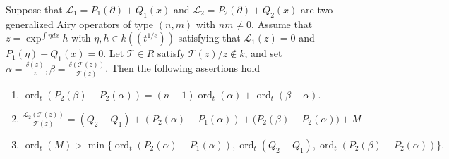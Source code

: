 \documentclass[10pt,a4paper]{amsart}
\DeclareMathOperator{\ord}{ord}
\newcommand{\calL}{{\mathcal{L}}}
\newcommand{\calT}{{\mathcal{T}}}
\begin{document}
\begin{lemma}
  \label{LM:minimalorderinL2}
  Suppose that $\calL_1=P_1(\partial)+Q_1(x)$ and $\calL_2=P_2(\partial)+Q_2(x)$
  are two generalized Airy operators of type $(n,m)$ with $nm\neq 0$. Assume that 
  $z=\exp^{\int \eta dx} h$ with $\eta, h\in k((t^{1/e}))$ satisfying that
  $\calL_1(z)=0$ and $P_1(\eta)+Q_1(x)=0$. Let $\calT\in R$ satisfy $\calT(z)/z \notin k$, and set $\alpha=\frac{\delta(z)}{z}, \beta=\frac{\delta(\calT(z))}{\calT(z)}$. 
  Then the following assertions hold
  \begin{enumerate}
  \item [(1)] $\ord_t(P_2(\beta)-P_2(\alpha))=(n-1)\ord_t(\alpha)+\ord_t(\beta-\alpha).$
    \item [(2)]
    $\frac{\calL_2(\calT(z))}{\calT(z)}=(Q_2-Q_1)
 +(P_2(\alpha)-P_1(\alpha))
 +\bigl(P_2(\beta)-P_2(\alpha)\bigr)+M
  $
  \item [(3)]$\ord_t(M)>
     \min
     \{\ord_t(P_2(\alpha)-P_1(\alpha)), \ord_t(Q_2-Q_1),
     \ord_t(P_2(\beta)-P_2(\alpha))\}.
  $
  \end{enumerate}
\end{lemma}
\end{document}
